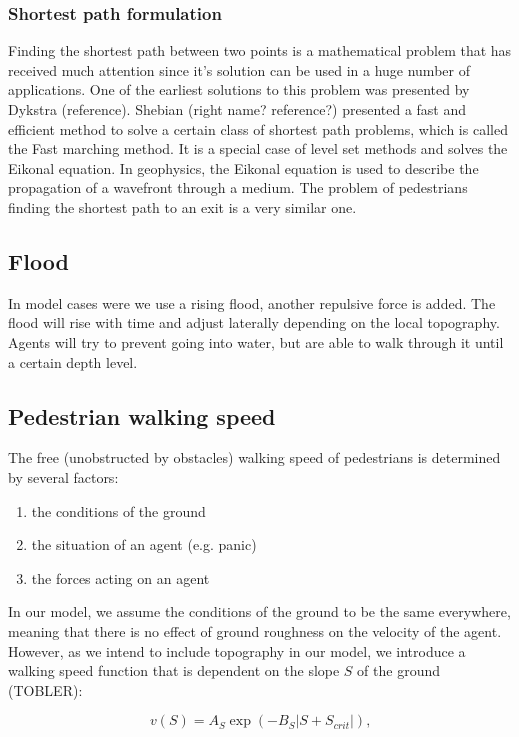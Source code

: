 \documentclass[11pt]{article}
\begin{document}
\subsubsection{Shortest path formulation}
Finding the shortest path between two points is a mathematical problem that has received much attention since it's solution can be used in a huge number of applications. One of the earliest solutions to this problem was presented by Dykstra (reference). Shebian (right name? reference?) presented a fast and efficient method to solve a certain class of shortest path problems, which is called the Fast marching method. It is a special case of level set methods and solves the Eikonal equation. 
In geophysics, the Eikonal equation is used to describe the propagation of a wavefront through a medium. The problem of pedestrians finding the shortest path to an exit is a very similar one. 

\subsection{Flood}
In model cases were we use a rising flood, another repulsive force is added. The flood will rise with time and adjust laterally depending on the local topography. Agents will try to prevent going into water, but are able to walk through it until a certain depth level.

\subsection{Pedestrian walking speed}

The free (unobstructed by obstacles) walking speed of pedestrians is determined by several factors:

\begin{enumerate}
\item the conditions of the ground
\item the situation of an agent (e.g. panic)
\item the forces acting on an agent
\end{enumerate}

In our model, we assume the conditions of the ground to be the same everywhere, meaning that there is no effect of ground roughness on the velocity of the agent. However, as we intend to include topography in our model, we introduce a walking speed function that is dependent on the slope $S$ of the ground (TOBLER):

\begin{equation}
	v(S) = A_{S} \exp{\left( -B_S | S + S_{crit} |  \right)}\mbox{,}
	\label{eq:walking_speed}
\end{equation}
\end{document}
